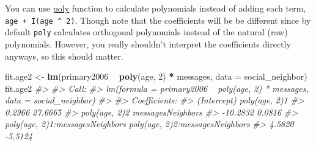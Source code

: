 \documentclass[]{book}
\newenvironment{Shaded}{\begin{snugshade}}{\end{snugshade}}
\newcommand{\CommentTok}[1]{\textcolor[rgb]{0.56,0.35,0.01}{\textit{#1}}}
\newcommand{\DataTypeTok}[1]{\textcolor[rgb]{0.13,0.29,0.53}{#1}}
\newcommand{\DecValTok}[1]{\textcolor[rgb]{0.00,0.00,0.81}{#1}}
\newcommand{\KeywordTok}[1]{\textcolor[rgb]{0.13,0.29,0.53}{\textbf{#1}}}
\newcommand{\NormalTok}[1]{#1}
\newcommand{\OperatorTok}[1]{\textcolor[rgb]{0.81,0.36,0.00}{\textbf{#1}}}
\newcommand{\StringTok}[1]{\textcolor[rgb]{0.31,0.60,0.02}{#1}}
\theoremstyle{definition}
\theoremstyle{definition}
\theoremstyle{definition}
\theoremstyle{remark}
\begin{document}
\begin{Shaded}
\end{Shaded}

You can use
\href{https://www.rdocumentation.org/packages/base/topics/poly}{poly}
function to calculate polynomials instead of adding each term,
\texttt{age\ +\ I(age\ \^{}\ 2)}. Though note that the coefficients will
be be different since by default \texttt{poly} calculates orthogonal
polynomials instead of the natural (raw) polynomials. However, you
really shouldn't interpret the coefficients directly anyways, so this
should matter.

\begin{Shaded}
\begin{Highlighting}[]
\NormalTok{fit.age2 <-}\StringTok{ }\KeywordTok{lm}\NormalTok{(primary2006 }\OperatorTok{~}\StringTok{ }\KeywordTok{poly}\NormalTok{(age, }\DecValTok{2}\NormalTok{) }\OperatorTok{*}\StringTok{ }\NormalTok{messages,}
               \DataTypeTok{data =}\NormalTok{ social_neighbor)}
\NormalTok{fit.age2}
\CommentTok{#> }
\CommentTok{#> Call:}
\CommentTok{#> lm(formula = primary2006 ~ poly(age, 2) * messages, data = social_neighbor)}
\CommentTok{#> }
\CommentTok{#> Coefficients:}
\CommentTok{#>                     (Intercept)                    poly(age, 2)1  }
\CommentTok{#>                          0.2966                          27.6665  }
\CommentTok{#>                   poly(age, 2)2                messagesNeighbors  }
\CommentTok{#>                        -10.2832                           0.0816  }
\CommentTok{#> poly(age, 2)1:messagesNeighbors  poly(age, 2)2:messagesNeighbors  }
\CommentTok{#>                          4.5820                          -5.5124}
\end{Highlighting}
\end{Shaded}
\end{document}
